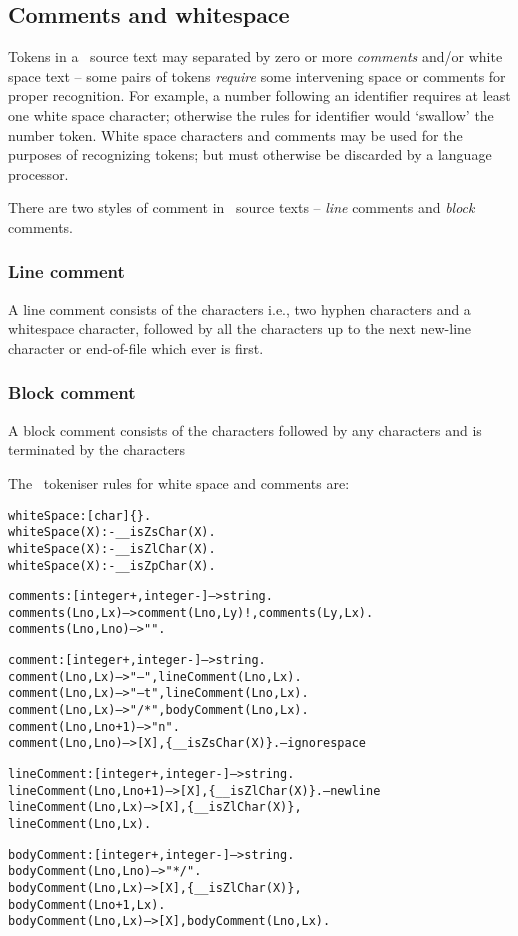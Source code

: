 \subsection{Comments and whitespace}
\label{token:comments}
Tokens in a \go\ source text may separated by zero or more \emph{comments} and/or white space text -- some pairs of tokens \emph{require} some intervening space or comments for proper recognition. For example, a number following an identifier requires at least one white space character; otherwise the rules for identifier would `swallow' the number token.  White space characters and comments may be used for the purposes of recognizing tokens; but must otherwise be discarded by a language processor.

There are two styles of comment in \go\ source texts -- \emph{line} comments and \emph{block} comments.

\subsubsection{Line comment}
\label{token:linecomment}
A line comment consists of the characters \constant{--\spce} i.e., two hyphen characters and a whitespace character, followed by all the characters up to the next new-line character or end-of-file which ever is first.

\subsubsection{Block comment}
\label{token:blockcomment}
A block comment consists of the characters \constant{/*} followed by any characters and is terminated by the characters \constant{*/}

The \go\ tokeniser rules for white space and comments are:
\begin{alltt}
whiteSpace:[char]\{\}.
whiteSpace(X):-__isZsChar(X).
whiteSpace(X):-__isZlChar(X).
whiteSpace(X):-__isZpChar(X).

comments:[integer+,integer-]-->string.
comments(Lno,Lx) --> comment(Lno,Ly)!, comments(Ly,Lx).
comments(Lno,Lno) --> "".

comment:[integer+,integer-]-->string.
comment(Lno,Lx) --> "-- ",lineComment(Lno,Lx).
comment(Lno,Lx) --> "--\bsl{}t",lineComment(Lno,Lx).
comment(Lno,Lx) --> "/*",bodyComment(Lno,Lx).
comment(Lno,Lno+1) --> "\bsl{}n".
comment(Lno,Lno) --> [X],\{\_\_isZsChar(X)\}. -- ignore space

lineComment:[integer+,integer-]-->string.
lineComment(Lno,Lno+1) --> [X],\{\_\_isZlChar(X)\}. -- new line
lineComment(Lno,Lx) --> [X],\{\nasf{}\_\_isZlChar(X)\},
        lineComment(Lno,Lx).

bodyComment:[integer+,integer-]-->string.
bodyComment(Lno,Lno) --> "*/".
bodyComment(Lno,Lx) --> [X],\{\_\_isZlChar(X)\},
        bodyComment(Lno+1,Lx).
bodyComment(Lno,Lx) --> [X],bodyComment(Lno,Lx).
\end{alltt}

